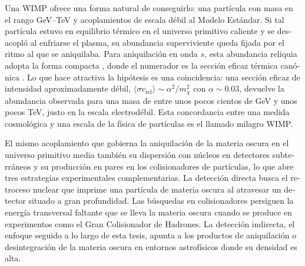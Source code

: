 \begin{otherlanguage}{spanish}
Una WIMP ofrece una forma natural de conseguirlo: una partícula con masa en el rango GeV--TeV y acoplamientos de escala débil al Modelo Estándar. Si tal partícula estuvo en equilibrio térmico en el universo primitivo caliente y se desacopló al enfriarse el plasma, su abundancia superviviente queda fijada por el ritmo al que se aniquilaba. Para aniquilación en onda $s$, esta abundancia reliquia adopta la forma compacta
\be
{} \approx {},
\ee
donde el numerador es la sección eficaz térmica canónica \cite{Steigman:2012nb, Cirelli:2024ssz}. Lo que hace atractiva la hipótesis es una coincidencia: una sección eficaz de intensidad aproximadamente débil, $\langle \sigma v_\mathrm{rel}\rangle \sim \alpha^2/m_\chi^2$ con $\alpha \sim 0.03$, devuelve la abundancia observada para una masa de entre unos pocos cientos de GeV y unos pocos TeV, justo en la escala electrodébil. Esta concordancia entre una medida cosmológica y una escala de la física de partículas es el llamado milagro WIMP.

El mismo acoplamiento que gobierna la aniquilación de la materia oscura en el universo primitivo media también su dispersión con núcleos en detectores subterráneos y su producción en pares en los colisionadores de partículas, lo que abre tres estrategias experimentales complementarias. La detección directa busca el retroceso nuclear que imprime una partícula de materia oscura al atravesar un detector situado a gran profundidad. Las búsquedas en colisionadores persiguen la energía transversal faltante que se lleva la materia oscura cuando se produce en experimentos como el Gran Colisionador de Hadrones. La detección indirecta, el enfoque seguido a lo largo de esta tesis, apunta a los productos de aniquilación o desintegración de la materia oscura en entornos astrofísicos donde su densidad es alta.


\end{otherlanguage}

